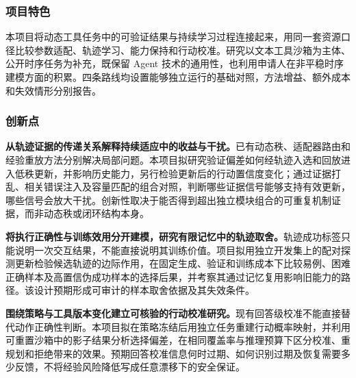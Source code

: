 \justifying
\NSFCBodyText

\subsubsection{项目特色}

本项目将动态工具任务中的可验证结果与持续学习过程连接起来，用同一套资源口径比较参数适配、轨迹学习、能力保持和行动校准。研究以文本工具沙箱为主体、公开时序任务为补充，既保留 Agent 技术的通用性，也利用申请人在非平稳时序建模方面的积累。四条路线均设置能够独立运行的基础对照，方法增益、额外成本和失效情形分别报告。

\subsubsection{创新点}

\textbf{从轨迹证据的传递关系解释持续适应中的收益与干扰。}已有动态秩、适配器路由和经验重放方法分别解决局部问题。本项目拟研究验证偏差如何经轨迹入选和回放进入低秩更新，并影响历史能力，另行检验更新后的行动置信度变化；通过证据打乱、相关错误注入及容量匹配的组合对照，判断哪些证据信号能够支持有效更新，哪些信号会放大干扰。创新性取决于能否得到超出独立模块组合的可重复机制证据，而非动态秩或闭环结构本身。

\textbf{将执行正确性与训练效用分开建模，研究有限记忆中的轨迹取舍。}轨迹成功标签只能说明一次交互结果，不能直接说明其训练价值。项目拟用独立开发集上的配对探测更新检验候选轨迹的边际作用，在固定生成、验证和训练成本下比较易例、困难正确样本及高置信伪成功样本的选择后果，并考察其通过记忆复用影响旧能力的路径。该设计预期形成可审计的样本取舍依据及其失效条件。

\textbf{围绕策略与工具版本变化建立可核验的行动校准研究。}现有回答级校准不能直接替代动作正确性判断。本项目拟在策略冻结后用独立任务重建行动概率映射，并利用可重置沙箱中的影子结果分析选择偏差，在相同覆盖率与推理预算下区分校准、重规划和拒绝带来的效果。预期回答校准信息何时过期、如何识别过期及恢复需要多少反馈，不将经验风险降低写成任意漂移下的安全保证。
